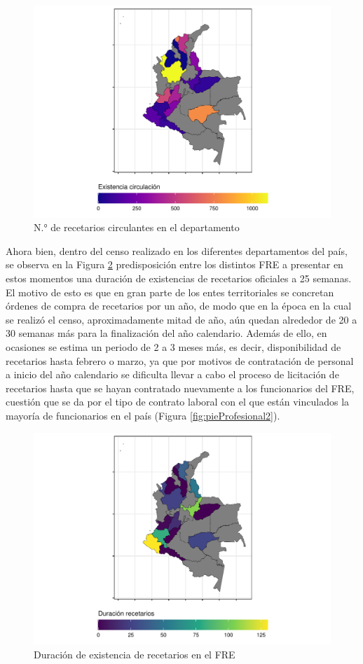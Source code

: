 \documentclass[
]{book}
\begin{document}
\begin{figure}
\includegraphics[width=0.85\linewidth]{InformeFinal_files/figure-latex/existenciasRecetarios2-1} \caption{N.° de recetarios circulantes en el departamento}\label{fig:existenciasRecetarios2}
\end{figure}

Ahora bien, dentro del censo realizado en los diferentes departamentos del país, se observa en la Figura \ref{fig:existenciaRecetarios3} predisposición entre los distintos FRE a presentar en estos momentos una duración de existencias de recetarios oficiales a 25 semanas. El motivo de esto es que en gran parte de los entes territoriales se concretan órdenes de compra de recetarios por un año, de modo que en la época en la cual se realizó el censo, aproximadamente mitad de año, aún quedan alrededor de 20 a 30 semanas más para la finalización del año calendario. Además de ello, en ocasiones se estima un periodo de 2 a 3 meses más, es decir, disponibilidad de recetarios hasta febrero o marzo, ya que por motivos de contratación de personal a inicio del año calendario se dificulta llevar a cabo el proceso de licitación de recetarios hasta que se hayan contratado nuevamente a los funcionarios del FRE, cuestión que se da por el tipo de contrato laboral con el que están vinculados la mayoría de funcionarios en el país (Figura \ref{fig:pieProfesional2}).

\begin{figure}
\includegraphics[width=0.85\linewidth]{InformeFinal_files/figure-latex/existenciaRecetarios3-1} \caption{Duración de existencia de recetarios en el FRE}\label{fig:existenciaRecetarios3}
\end{figure}
\end{document}

